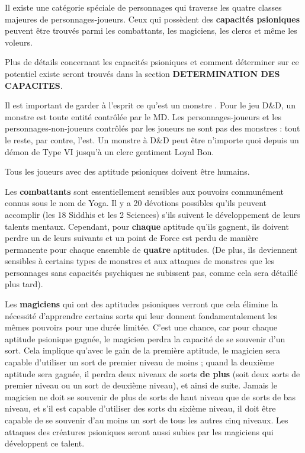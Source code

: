 \documentclass[12pt]{article}
\begin{document}
{\parindent0pt

Il existe une catégorie spéciale de personnages qui traverse les quatre classes majeures de personnages-joueurs. Ceux qui possèdent des \textbf{capacités psioniques} peuvent être trouvés parmi les combattants, les magiciens, les clercs et même les voleurs.

\bigskip

Plus de détails concernant les capacités psioniques et comment déterminer sur ce potentiel existe seront trouvés dans la section \textbf{DETERMINATION DES CAPACITES}.

\bigskip

Il est important de garder à l'esprit ce qu'est un \og monstre \fg{}. Pour le jeu D\&D, un monstre est toute entité contrôlée par le MD. Les personnages-joueurs et les personnages-non-joueurs contrôlés par les joueurs ne sont pas des monstres : tout le reste, par contre, l'est. Un monstre à D\&D peut être n'importe quoi depuis un démon de Type VI jusqu'à un clerc gentiment Loyal Bon.

\bigskip

Tous les joueurs avec des aptitude psioniques doivent être humains.

\bigskip

Les \textbf{combattants} sont essentiellement sensibles aux pouvoirs communément connus sous le nom de Yoga. Il y a 20 \og dévotions \fg{} possibles qu'ils peuvent accomplir (les 18 Siddhis et les 2 Sciences) s'ils suivent le développement de leurs talents mentaux. Cependant, pour \textbf{chaque} aptitude qu'ils gagnent, ils doivent perdre un de leurs suivants et un point de Force est perdu de manière permanente pour chaque ensemble de \textbf{quatre} aptitudes. (De plus, ils deviennent sensibles à certains types de monstres et aux attaques de monstres que les personnages sans capacités psychiques ne subissent pas, comme cela sera détaillé plus tard).

\bigskip

Les \textbf{magiciens} qui ont des aptitudes psioniques verront que cela élimine la nécessité d'apprendre certains sorts qui leur donnent fondamentalement les mêmes pouvoirs pour une durée limitée. C'est une chance, car pour chaque aptitude psionique gagnée, le magicien perdra la capacité de se souvenir d'un sort. Cela implique qu'avec le gain de la première aptitude, le magicien sera capable d'utiliser un sort de premier niveau de moins ; quand la deuxième aptitude sera gagnée, il perdra deux niveaux de sorts \textbf{de plus} (soit deux sorts de premier niveau ou un sort de deuxième niveau), et ainsi de suite. Jamais le magicien ne doit se souvenir de plus de sorts de haut niveau que de sorts de bas niveau, et s'il est capable d'utiliser des sorts du sixième niveau, il doit être capable de se souvenir d'au moins un sort de tous les autres cinq niveaux. Les attaques des créatures psioniques seront aussi subies par les magiciens qui développent ce talent.

}
\end{document}
